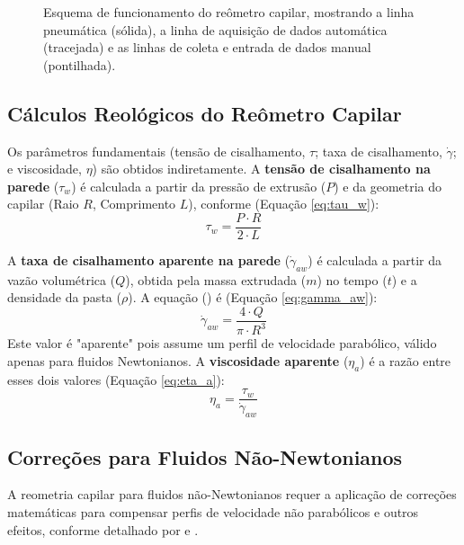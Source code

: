 \documentclass[article,12pt,oneside,a4paper,english,brazil,sumario=tradicional]{abntex2}
\begin{document}
\begin{figure}[htbp]
{
}
\caption{Esquema de funcionamento do reômetro capilar, mostrando a linha pneumática (sólida), a linha de aquisição de dados automática (tracejada) e as linhas de coleta e entrada de dados manual (pontilhada).}
\label{fig:esquema_reometro}
\end{figure}


\subsection{Cálculos Reológicos do Reômetro Capilar}
Os parâmetros fundamentais (tensão de cisalhamento, $\tau$; taxa de cisalhamento, $\dot{\gamma}$; e viscosidade, $\eta$) são obtidos indiretamente. A \textbf{tensão de cisalhamento na parede} ($\tau_w$) é calculada a partir da pressão de extrusão ($P$) e da geometria do capilar (Raio $R$, Comprimento $L$), conforme  (Equação \ref{eq:tau_w}):
\begin{equation} \label{eq:tau_w}
    \tau_w = \frac{P \cdot R}{2 \cdot L}
\end{equation}

A \textbf{taxa de cisalhamento aparente na parede} ($\dot{\gamma}_{aw}$) é calculada a partir da vazão volumétrica ($Q$), obtida pela massa extrudada ($m$) no tempo ($t$) e a densidade da pasta ($\rho$). A equação () é (Equação \ref{eq:gamma_aw}):
\begin{equation} \label{eq:gamma_aw}
    \dot{\gamma}_{aw} = \frac{4 \cdot Q}{\pi \cdot R^3}
\end{equation}
Este valor é "aparente" pois assume um perfil de velocidade parabólico, válido apenas para fluidos Newtonianos. A \textbf{viscosidade aparente} ($\eta_a$) é a razão entre esses dois valores (Equação \ref{eq:eta_a}):
\begin{equation} \label{eq:eta_a}
    \eta_a = \frac{\tau_w}{\dot{\gamma}_{aw}}
\end{equation}

\subsection{Correções para Fluidos Não-Newtonianos}
\label{subsec:correcoes}
A reometria capilar para fluidos não-Newtonianos requer a aplicação de correções matemáticas para compensar perfis de velocidade não parabólicos e outros efeitos, conforme detalhado por  e .
\end{document}
